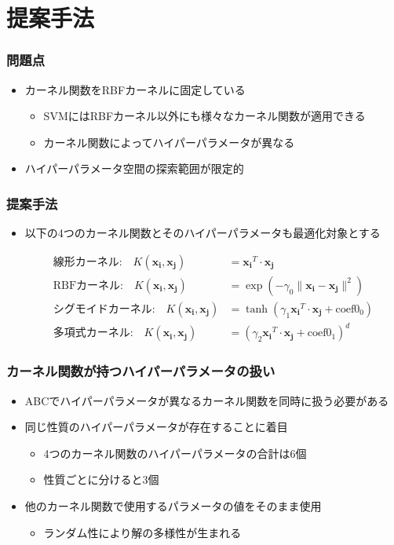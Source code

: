 \documentclass[11pt,dvipdfmx,cjk]{beamer}
\begin{document}
\section{提案手法}
  \begin{frame}
    \frametitle{問題点}
    \begin{itemize}
      \item カーネル関数をRBFカーネルに固定している
      \begin{itemize}
       \item SVMにはRBFカーネル以外にも様々なカーネル関数が適用できる      
      \item カーネル関数によってハイパーパラメータが異なる
    \end{itemize}
    \item ハイパーパラメータ空間の探索範囲が限定的
  \end{itemize}
\end{frame}
  
  \begin{frame}
    \frametitle{提案手法}
    \begin{itemize}
      \item 以下の4つのカーネル関数とそのハイパーパラメータも最適化対象とする
      
      \begin{align*}
        \text{線形カーネル:} \quad K(\boldsymbol{x_i}, \boldsymbol{x_j}) &= \boldsymbol{x_i}^T \cdot \boldsymbol{x_j} \\
        \text{RBFカーネル:} \quad K(\boldsymbol{x_i}, \boldsymbol{x_j}) &= \exp\left(-\gamma_0 \| \boldsymbol{x_i} - \boldsymbol{x_j} \|^2\right) \\
        \text{シグモイドカーネル:} \quad K(\boldsymbol{x_i}, \boldsymbol{x_j}) &= \tanh(\gamma_1 \boldsymbol{x_i}^T \cdot \boldsymbol{x_j} + \text{coef0}_0) \\
        \text{多項式カーネル:} \quad K(\boldsymbol{x_i}, \boldsymbol{x_j}) &= (\gamma_2\boldsymbol{x_i}^T \cdot \boldsymbol{x_j} + \text{coef0}_1)^d
       \end{align*}
    \end{itemize}
  \end{frame}
\begin{frame}
  \frametitle{カーネル関数が持つハイパーパラメータの扱い}
  \begin{itemize}
  \item ABCでハイパーパラメータが異なるカーネル関数を同時に扱う必要がある
  \item  同じ性質のハイパーパラメータが存在することに着目
      \begin{itemize}
      \item 4つのカーネル関数のハイパーパラメータの合計は6個
      \item 性質ごとに分けると3個
     \end{itemize}
  \item  他のカーネル関数で使用するパラメータの値をそのまま使用
     \begin{itemize}
     \item  ランダム性により解の多様性が生まれる
    \end{itemize}
  \end{itemize}
\end{frame}
\end{document}
